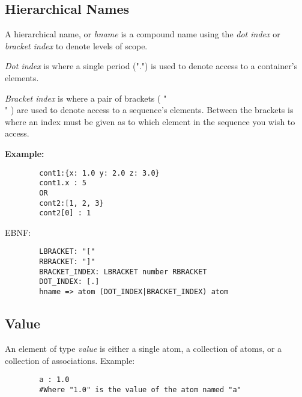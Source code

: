 \documentclass{memarticle}
\begin{document}
{                \subsection{Hierarchical Names}
                        A hierarchical name,
                        or \emph{hname} is a compound name 
                        using the \emph{dot index}
                        or \emph{bracket index}
                        to denote levels of scope.
                        \par
                        \emph{Dot index} is where a single period (".")
                        is used to denote access to a container's elements.
                        \par
                        \emph{Bracket index} is where a pair of brackets ( "\[ \]" )
                        are used to denote access to a sequence's elements.
                        Between the brackets is where an index must be given
                        as to which element in the sequence you wish to access.
                        \par
                        \textbf{Example:}
                        \begin{verbatim}
        cont1:{x: 1.0 y: 2.0 z: 3.0}
        cont1.x : 5
        OR
        cont2:[1, 2, 3}
        cont2[0] : 1
                        \end{verbatim}
                        \par
                        EBNF:
                        \begin{verbatim}
        LBRACKET: "["
        RBRACKET: "]"
        BRACKET_INDEX: LBRACKET number RBRACKET
        DOT_INDEX: [.]
        hname => atom (DOT_INDEX|BRACKET_INDEX) atom
                        \end{verbatim}
                \subsection{Value}
                        An element of type \emph{value} is either a single atom, 
                        a collection of atoms,
                        or a collection of associations.
                        Example:
                        \begin{verbatim}
        a : 1.0
        #Where "1.0" is the value of the atom named "a"
                        \end{verbatim}
                        
}
\end{document}
